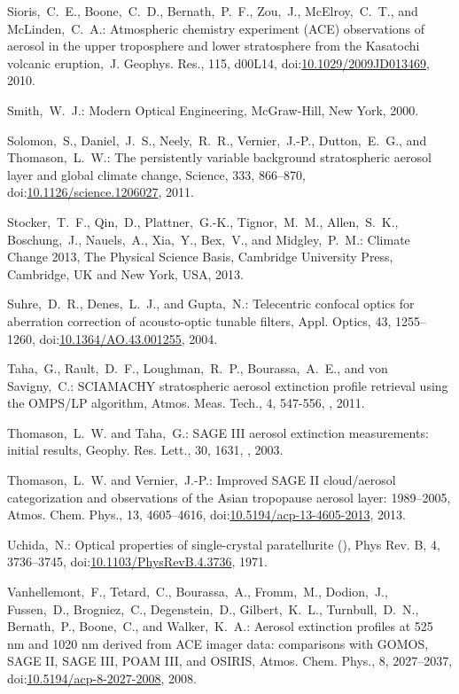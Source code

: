 \documentclass[amtd, online, hvmath]{copernicus}
\begin{document}
\begin{thebibliography}{99}
Sioris,~C.~E., Boone,~C.~D., Bernath,~P.~F., Zou,~J., McElroy,~C.~T., and
McLinden,~C.~A.: Atmospheric chemistry experiment (ACE) observations of
aerosol in the upper troposphere and lower stratosphere from the Kasatochi
volcanic eruption,~J. Geophys. Res., 115, d00L14,
doi:\href{http://dx.doi.org/10.1029/2009JD013469}{10.1029/2009JD013469},
2010.


Smith,~W.~J.: Modern Optical Engineering, McGraw-Hill, New York, 2000.


Solomon,~S., Daniel,~J.~S., Neely,~R.~R., Vernier,~J.-P., Dutton,~E.~G., and
Thomason,~L.~W.: The persistently variable background stratospheric aerosol
layer and global climate change, Science, 333, 866--870,
doi:\href{http://dx.doi.org/10.1126/science.1206027}{10.1126/science.1206027},
2011.


Stocker,~T.~F., Qin,~D., Plattner,~G.-K., Tignor,~M.~M., Allen,~S.~K.,
Boschung,~J., Nauels,~A., Xia,~Y., Bex,~V., and Midgley,~P.~M.: Climate
Change 2013, The Physical Science Basis, Cambridge University Press,
Cambridge, UK and New York, USA, 2013.


Suhre,~D.~R., Denes,~L.~J., and Gupta,~N.: Telecentric confocal optics for
aberration correction of acousto-optic tunable filters, Appl. Optics, 43,
1255--1260,
doi:\href{http://dx.doi.org/10.1364/AO.43.001255}{10.1364/AO.43.001255},
2004.

Taha,~G., Rault,~D.~F., Loughman,~R.~P., Bourassa,~A.~E., and von Savigny,~C.:
SCIAMACHY stratospheric aerosol extinction profile retrieval using the OMPS/LP
algorithm, Atmos. Meas. Tech., 4, 547-556, , 2011.

Thomason,~L.~W. and Taha,~G.: SAGE III aerosol extinction measurements:
initial results, Geophy. Res. Lett., 30, 1631, ,
2003.


Thomason,~L.~W. and Vernier,~J.-P.: Improved SAGE II cloud/aerosol
categorization and observations of the Asian tropopause aerosol layer:
1989--2005, Atmos. Chem. Phys., 13, 4605--4616,
doi:\href{http://dx.doi.org/10.5194/acp-13-4605-2013}{10.5194/acp-13-4605-2013},
2013.


Uchida,~N.: Optical properties of single-crystal paratellurite
(), Phys Rev. B, 4, 3736--3745,
doi:\href{http://dx.doi.org/10.1103/PhysRevB.4.3736}{10.1103/PhysRevB.4.3736},
1971.


Vanhellemont,~F., Tetard,~C., Bourassa,~A., Fromm,~M., Dodion,~J.,
Fussen,~D., Brogniez,~C., Degenstein,~D., Gilbert,~K.~L., Turnbull,~D.~N.,
Bernath,~P., Boone,~C., and Walker,~K.~A.: Aerosol extinction profiles at 525
nm and 1020 nm derived from ACE imager data: comparisons with GOMOS, SAGE II,
SAGE III, POAM III, and OSIRIS, Atmos. Chem. Phys., 8, 2027--2037,
doi:\href{http://dx.doi.org/10.5194/acp-8-2027-2008}{10.5194/acp-8-2027-2008},
2008.



\end{thebibliography}
\end{document}
